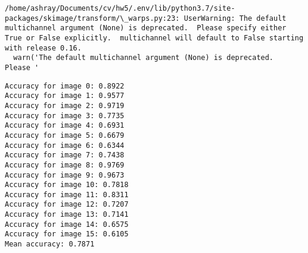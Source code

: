 \documentclass[11pt]{article}
\begin{document}
    \begin{Verbatim}[commandchars=\\\{\}]
/home/ashray/Documents/cv/hw5/.env/lib/python3.7/site-packages/skimage/transform/\_warps.py:23: UserWarning: The default multichannel argument (None) is deprecated.  Please specify either True or False explicitly.  multichannel will default to False starting with release 0.16.
  warn('The default multichannel argument (None) is deprecated.  Please '

    \end{Verbatim}

    \begin{Verbatim}[commandchars=\\\{\}]
Accuracy for image 0: 0.8922
Accuracy for image 1: 0.9577
Accuracy for image 2: 0.9719
Accuracy for image 3: 0.7735
Accuracy for image 4: 0.6931
Accuracy for image 5: 0.6679
Accuracy for image 6: 0.6344
Accuracy for image 7: 0.7438
Accuracy for image 8: 0.9769
Accuracy for image 9: 0.9673
Accuracy for image 10: 0.7818
Accuracy for image 11: 0.8311
Accuracy for image 12: 0.7207
Accuracy for image 13: 0.7141
Accuracy for image 14: 0.6575
Accuracy for image 15: 0.6105
Mean accuracy: 0.7871

    \end{Verbatim}
\end{document}
